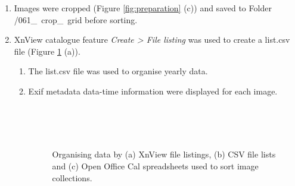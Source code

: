 \begin{enumerate}
\item Images were cropped (Figure \ref{fig:preparation} (c)) and saved to Folder \\
/061\_~crop\_~grid before sorting.
\item XnView catalogue feature \emph{Create > File listing} was used to create a list.csv file (Figure \ref{fig:sort} (a)).
\begin{enumerate}
	\item The list.csv file was used to organise yearly data.
	\item Exif metadata data-time information were displayed for each image.
		\begin{figure}[!htbp]\myfloatalign
		\\
		\\
		\\
		\caption[File organising and procedures.]{Organising data by (a) XnView file listings, (b) CSV file lists  and (c) Open Office Cal spreadsheets used to sort image collections. }\label{fig:sort}

\end{figure}
\end{enumerate}
\end{enumerate}
